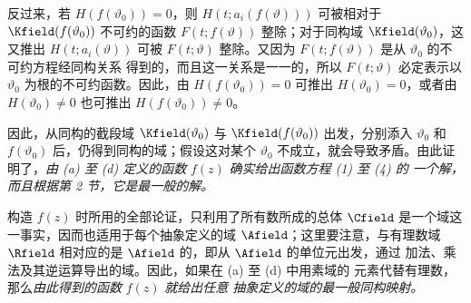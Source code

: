 反过来，若 \(H(f(\vartheta_0))=0\)，则
\(H(t;a_i(f(\vartheta)))\) 可被相对于
\(\Kfield(f(\vartheta_0))\) 不可约的函数
\(F(t;f(\vartheta))\) 整除；对于同构域
\(\Kfield(\vartheta_0)\)，这又推出
\(H(t;a_i(\vartheta))\) 可被 \(F(t;\vartheta)\) 整除。又因为
\(F(t;f(\vartheta))\) 是从 \(\vartheta_0\) 的不可约方程经同构关系
得到的，而且这一关系是一一的，所以 \(F(t;\vartheta)\) 必定表示以
\(\vartheta_0\) 为根的不可约函数。因此，由
\(H(f(\vartheta_0))=0\) 可推出 \(H(\vartheta_0)=0\)，或者由
\(H(\vartheta_0)\ne0\) 也可推出 \(H(f(\vartheta_0))\ne0\)。

因此，从同构的截段域 \(\Kfield(\vartheta_0)\) 与
\(\Kfield(f(\vartheta_0))\) 出发，分别添入 \(\vartheta_0\) 和
\(f(\vartheta_0)\) 后，仍得到同构的域；假设这对某个
\(\vartheta_0\) 不成立，就会导致矛盾。由此证明了，\emph{由 (a) 至
(d) 定义的函数} \(f(z)\) \emph{确实给出函数方程 (1) 至 (4) 的
一个解，而且根据第 2 节，它是最一般的解。}

构造 \(f(z)\) 时所用的全部论证，只利用了所有数所成的总体
\(\Cfield\) 是一个域这一事实，因而也适用于每个抽象定义的域
\(\Afield\)；这里要注意，与有理数域 \(\Rfield\) 相对应的是
\(\Afield\) 的，即从 \(\Afield\) 的单位元出发，通过
加法、乘法及其逆运算导出的域。因此，如果在 (a) 至 (d) 中用素域的
元素代替有理数，那么\emph{由此得到的函数} \(f(z)\) \emph{就给出任意
抽象定义的域的最一般同构映射。}

\medskip

